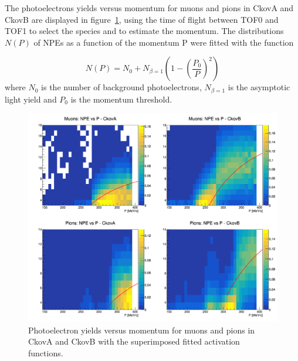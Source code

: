 The photoelectrons yields versus momentum for muons and pions in CkovA and CkovB are displayed in figure~\ref{fig:ckov2}, using the time of flight between TOF0 and TOF1 to select the species and to estimate the momentum.
The distributions $N(P)$ of NPEs as a function of the momentum P were fitted with the function

\begin{equation}
N(P) = N_0 + N_{\beta=1}\left(1-\left(\frac{P_0}{P}\right)^2\right)
\end{equation}
where $N_0$ is the number of background photoelectrons, $N_{\beta=1}$ is the asymptotic light yield and $P_0$ is the momentum threshold.


\begin{figure}[htb!]
  \begin{center}
    \includegraphics[width=0.85\columnwidth]{./03-Ckov/Figures/scatter_activation.png}
    \caption{Photoelectron yields versus momentum for muons and pions in CkovA and CkovB with the superimposed fitted activation functions.}
    \label{fig:ckov2}
  \end{center}
\end{figure}

